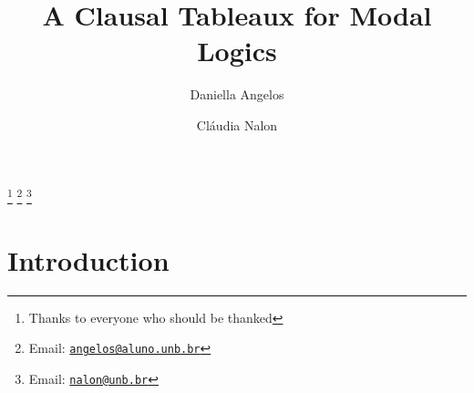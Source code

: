 \documentclass{entcs}
\begin{document}


\begin{frontmatter}
    \title{A Clausal Tableaux for Modal Logics} 
    \author{Daniella Angelos}
    \address{Department of Computer Science\\ University of Bras\'ilia\\
    CEP: 70.910-090, Bras\'ilia, DF, Brazil} 
    \author{Cl\'audia Nalon}
    \address{Department of Computer Science\\ University of Bras\'ilia\\
    CEP: 70.910-090, Bras\'ilia, DF, Brazil} 
    \thanks[ALL]{Thanks to everyone who should be thanked} 
    \thanks[myemail]{Email: \href{mailto:angelos@aluno.unb.br} {\texttt{\normalshape angelos@aluno.unb.br}}} 
    \thanks[coemail]{Email: \href{mailto:nalon@unb.br} {\texttt{\normalshape nalon@unb.br}}}
\begin{abstract} 
\end{abstract}
\begin{keyword}
\end{keyword}
\end{frontmatter}
\section{Introduction}
\label{intro}










\end{document}
